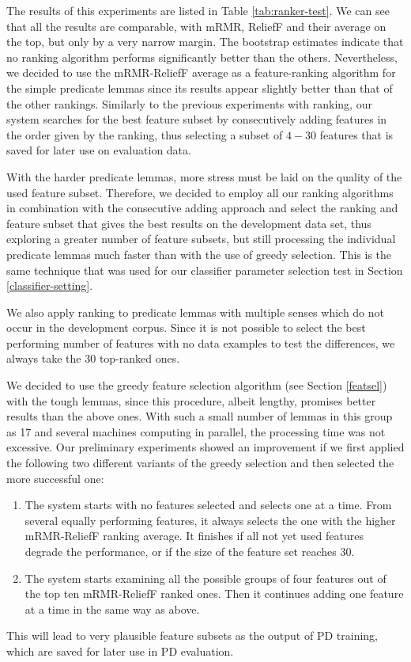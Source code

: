 \documentclass[12pt,notitlepage]{report}
\begin{document}
The results of this experiments are listed in Table \ref{tab:ranker-test}. We can see that all the results are comparable, with mRMR, ReliefF and their average on the top, but only by a very narrow margin. The bootstrap estimates indicate that no ranking algorithm performs significantly better than the others. Nevertheless, we decided to use the mRMR-ReliefF average as a feature-ranking algorithm for the simple predicate lemmas since its results appear slightly better than that of the other rankings. Similarly to the previous experiments with ranking, our system searches for the best feature subset by consecutively adding features in the order given by the ranking, thus selecting a subset of $4-30$ features that is saved for later use on evaluation data.

With the harder predicate lemmas, more stress must be laid on the quality of the used feature subset. Therefore, we decided to employ all our ranking algorithms in combination with the consecutive adding approach and select the ranking and feature subset that gives the best results on the development data set, thus exploring a greater number of feature subsets, but still processing the individual predicate lemmas much faster than with the use of greedy selection. This is the same technique that was used for our classifier parameter selection test in Section \ref{classifier-setting}. 

We also apply ranking to predicate lemmas with multiple senses which do not occur in the development corpus. Since it is not possible to select the best performing number of features with no data examples to test the differences, we always take the 30 top-ranked ones.

We decided to use the greedy feature selection algorithm (see Section \ref{featsel}) with the tough lemmas, since this procedure, albeit lengthy, promises better results than the above ones. With such a small number of lemmas in this group as 17 and several machines computing in parallel, the processing time was not excessive. Our preliminary experiments showed an improvement if we first applied the following two different variants of the greedy selection and then selected the more successful one:
\begin{enumerate}
    \item The system starts with no features selected and selects one at a time. From several equally performing features, it always selects the one with the higher mRMR-ReliefF ranking average. It finishes if all not yet used features degrade the performance, or if the size of the feature set reaches 30.
    \item The system starts examining all the possible groups of four features out of the top ten mRMR-ReliefF ranked ones. Then it continues adding one feature at a time in the same way as above.
\end{enumerate}
This will lead to very plausible feature subsets as the output of PD training, which are saved for later use in PD evaluation.
\end{document}
